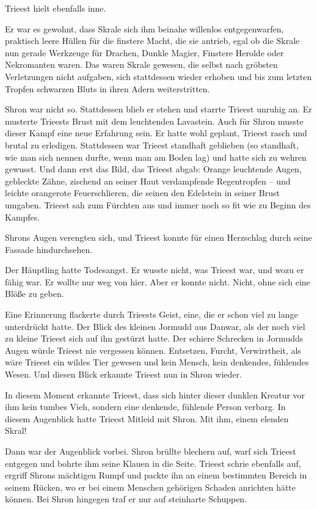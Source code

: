Trieest hielt ebenfalls inne.

Er war es gewohnt, dass Skrale sich ihm beinahe willenlos entgegenwarfen, praktisch leere Hüllen für die finstere Macht, die sie antrieb, egal ob die Skrale nun gerade Werkzeuge für Drachen, Dunkle Magier, Finstere Herolde oder Nekromanten waren. Das waren Skrale gewesen, die selbst nach gröbsten Verletzungen nicht aufgaben, sich stattdessen wieder erhoben und bis zum letzten Tropfen schwarzen Bluts in ihren Adern weiterstritten.

Shron war nicht so. Stattdessen blieb er stehen und starrte Trieest unruhig an. Er musterte Trieests Brust mit dem leuchtenden Lavastein. Auch für Shron musste dieser Kampf eine neue Erfahrung sein. Er hatte wohl geplant, Trieest rasch und brutal zu erledigen. Stattdessen war Trieest standhaft geblieben (so standhaft, wie man sich nennen durfte, wenn man am Boden lag) und hatte sich zu wehren gewusst. Und dann erst das Bild, das Trieest abgab: Orange leuchtende Augen, gebleckte Zähne, zischend an seiner Haut verdampfende Regentropfen – und leichte orangerote Feuerschlieren, die seinen den Edelstein in seiner Brust umgaben. Trieest sah zum Fürchten aus und immer noch so fit wie zu Beginn des Kampfes.

Shrons Augen verengten sich, und Trieest konnte für einen Herzschlag durch seine Fassade hindurchsehen.

Der Häuptling hatte Todesangst. Er wusste nicht, was Trieest war, und wozu er fähig war. Er wollte nur weg von hier. Aber er konnte nicht. Nicht, ohne sich eine Blöße zu geben.

Eine Erinnerung flackerte durch Trieests Geist, eine, die er schon viel zu lange unterdrückt hatte. Der Blick des kleinen Jormudd aus Danwar, als der noch viel zu kleine Trieest sich auf ihn gestürzt hatte. Der schiere Schrecken in Jormudds Augen würde Trieest nie vergessen können. Entsetzen, Furcht, Verwirrtheit, als wäre Trieest ein wildes Tier gewesen und kein Mensch, kein denkendes, fühlendes Wesen. Und diesen Blick erkannte Trieest nun in Shron wieder.

In diesem Moment erkannte Trieest, dass sich hinter dieser dunklen Kreatur vor ihm kein tumbes Vieh, sondern eine denkende, fühlende Person verbarg. In diesem Augenblick hatte Trieest Mitleid mit Shron. Mit ihm, einem elenden Skral!

Dann war der Augenblick vorbei. Shron brüllte blechern auf, warf sich Trieest entgegen und bohrte ihm seine Klauen in die Seite. Trieest schrie ebenfalls auf, ergriff Shrons mächtigen Rumpf und packte ihn an einem bestimmten Bereich in seinem Rücken, wo er bei einem Menschen gehörigen Schaden anrichten hätte können. Bei Shron hingegen traf er nur auf steinharte Schuppen.

